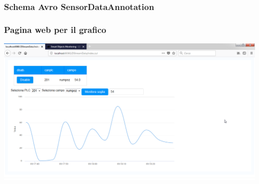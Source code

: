 \documentclass{beamer}
\begin{document}
\begin{frame}
\frametitle{Schema Avro SensorDataAnnotation}
\begin{figure}%
	\centering
	\qquad
\end{figure}
\end{frame}

\begin{frame}
\frametitle{Pagina web per il grafico}
\includegraphics[width=1\textwidth]{images/grafico-zk.png}
\end{frame}
\end{document}

